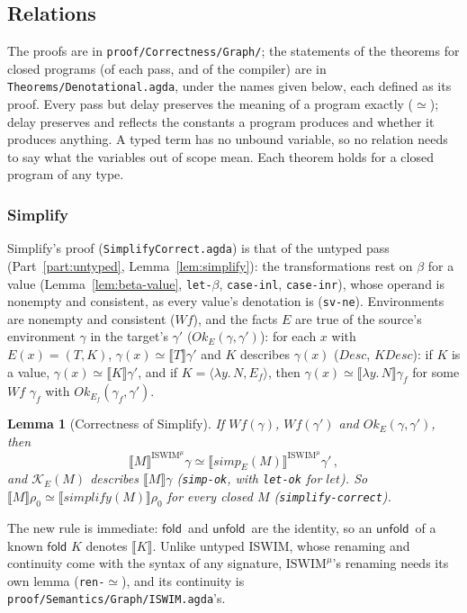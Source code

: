 \documentclass[10pt]{article}
\theoremstyle{acmplain}
\newtheorem{lemma}[theorem]{Lemma}
\newcommand{\SEM}[1]{\llbracket #1 \rrbracket}
\newcommand{\key}[1]{\mathsf{#1}}
\newcommand{\pass}[1]{\mathit{#1}}
\newcommand{\lam}[1]{\lambda #1.\,}
\newcommand{\Ml}[1]{\textrm{#1}^{\mu}}                  %
\newcommand{\Mfold}{\key{fold}\,}
\newcommand{\Munfold}{\key{unfold}\,}
\begin{document}
\subsection{Relations}\label{sec:m-den-rel}

The proofs are in \texttt{proof/Correctness/Graph/}; the statements of the
theorems for closed programs (of each pass, and of the compiler) are in
\texttt{Theorems/\allowbreak Denotational.agda}, under the names given below, each
defined as its proof. Every pass but delay
preserves the meaning of a program exactly ($\simeq$); delay preserves and
reflects the constants a program produces and whether it produces
anything. A typed term has no unbound variable, so no relation needs to
say what the variables out of scope mean. Each theorem holds for a closed
program of any type.

\subsubsection{Simplify}

Simplify's proof (\texttt{SimplifyCorrect.agda}) is that of the untyped
pass (Part~\ref{part:untyped}, Lemma~\ref{lem:simplify}): the
transformations rest on $\beta$ for a value
(Lemma~\ref{lem:beta-value}, \texttt{let-$\beta$}, \texttt{case-inl},
\texttt{case-inr}), whose operand is nonempty and consistent, as every
value's denotation is (\texttt{sv-ne}). Environments are nonempty and
consistent ($\mathit{Wf}$), and the facts $E$ are true of the source's
environment $\gamma$ in the target's $\gamma'$
($\mathit{Ok}_E(\gamma, \gamma')$): for each $x$ with $E(x) = (T, K)$,
$\gamma(x) \simeq \SEM{T}\gamma'$ and $K$ describes $\gamma(x)$
($\mathit{Desc}$, $\mathit{KDesc}$): if $K$ is a value,
$\gamma(x) \simeq \SEM{K}\gamma'$, and if $K = \langle \lam{y} N, E_f
\rangle$, then $\gamma(x) \simeq \SEM{\lam{y} N}\gamma_f$ for some
$\mathit{Wf}$ $\gamma_f$ with $\mathit{Ok}_{E_f}(\gamma_f, \gamma')$.
\begin{lemma}[Correctness of Simplify]\label{lem:m-den-simplify}
If $\mathit{Wf}(\gamma)$, $\mathit{Wf}(\gamma')$ and $\mathit{Ok}_E(\gamma, \gamma')$, then
\[ \SEM{M}^{\Ml{ISWIM}}\gamma \simeq \SEM{\pass{simp}_E(M)}^{\Ml{ISWIM}}\gamma'\,, \]
and $\mathcal{K}_E(M)$ describes $\SEM{M}\gamma$ (\texttt{simp-ok}, with
\texttt{let-ok} for $\pass{let}$). So
$\SEM{M}\rho_0 \simeq \SEM{\pass{simplify}(M)}\rho_0$ for every closed $M$
(\texttt{simplify-correct}).
\end{lemma}
The new rule is immediate: $\Mfold$ and $\Munfold$ are the identity, so an
$\Munfold$ of a known $\Mfold\,K$ denotes $\SEM{K}$. Unlike untyped ISWIM,
whose renaming and continuity come with the syntax of any signature,
$\Ml{ISWIM}$'s renaming needs its own lemma (\texttt{ren-$\simeq$}), and its
continuity is \texttt{proof/Semantics/Graph/ISWIM.agda}'s.
\end{document}
